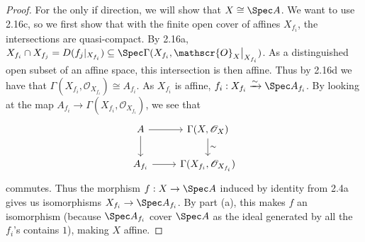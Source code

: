 \begin{exercise}
\begin{enumerate}[(a)]
\begin{proof}
		For the only if direction, we will show that $X \cong \Spec A $.
		We want to use 2.16c, so we first show that with the finite open cover of affines $X_{f_i} $, the intersections are quasi-compact.
		By 2.16a, $X_{f_i}\cap X_{f_j} = D(f_j|_{X_{f_i}})  \subseteq \Spec \Gamma(X_{f_i},\mathscr{O}_X\big|_{X_{f_i}})$.
		As a distinguished open subset of an affine space, this intersection is then affine.
		Thus by 2.16d we have that $\Gamma(X_{f_i},\mathscr{O}_{X_{f_i}}) \cong A_{f_i} $.
		As $X_{f_i}$ is affine, $f_i: X_{f_i}\xrightarrow{\sim} \Spec A_{f_i} $.
		By looking at the map $A_{f_i}\to \Gamma(X_{f_i}, \mathscr{O}_{X_{f_i}}) $, we see that
		\[
		\begin{tikzcd}
		A & \Gamma(X, \mathscr{O}_X)\\
		A_{f_i} & \Gamma(X_{f_i},\mathscr{O}_{X_{f_i}})
		\arrow[from=1-1,to=1-2]
		\arrow[from=1-1,to=2-1]
		\arrow[from=2-1,to=2-2]
		\arrow["\sim",from=1-2,to=2-2]
		\end{tikzcd}
		\]
		commutes.
		Thus the morphism $f:X\to \Spec A $ induced by identity from 2.4a gives us isomorphisms $X_{f_i}\to \Spec A_{f_i} $.
		By part (a), this makes $f $ an isomorphism (because $\Spec A_{f_i} $ cover $\Spec A $ as the ideal generated by all the $f_i $'s contains $1$), making $X $ affine.
	\end{proof}
\end{enumerate}
\end{exercise}

